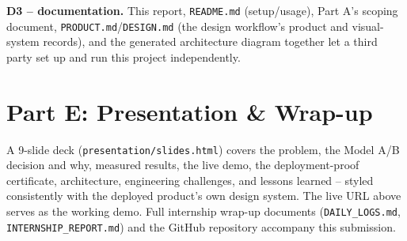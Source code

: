 \documentclass[11pt,a4paper]{article}
\begin{document}
\textbf{D3 -- documentation.} This report, \texttt{README.md} (setup/usage), Part A's
scoping document, \texttt{PRODUCT.md}/\texttt{DESIGN.md} (the design workflow's product and
visual-system records), and the generated architecture diagram together let a third party
set up and run this project independently.

\section*{Part E: Presentation \& Wrap-up}

A 9-slide deck (\texttt{presentation/slides.html}) covers the problem, the Model A/B
decision and why, measured results, the live demo, the deployment-proof certificate,
architecture, engineering challenges, and lessons learned -- styled consistently with the
deployed product's own design system. The live URL above serves as the working demo. Full
internship wrap-up documents (\texttt{DAILY\_LOGS.md}, \texttt{INTERNSHIP\_REPORT.md}) and
the GitHub repository accompany this submission.
\end{document}
